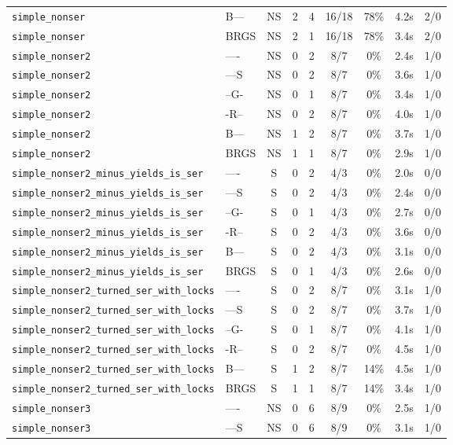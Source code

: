\begin{tabular}{llccccccc}
\texttt{simple_nonser} & B--- & NS & 2 & 4 & 16/18 & 78\% & 4.2s & 2/0 \\
\texttt{simple_nonser} & BRGS & NS & 2 & 1 & 16/18 & 78\% & 3.4s & 2/0 \\
\texttt{simple_nonser2} & ---- & NS & 0 & 2 & 8/7 & 0\% & 2.4s & 1/0 \\
\texttt{simple_nonser2} & ---S & NS & 0 & 2 & 8/7 & 0\% & 3.6s & 1/0 \\
\texttt{simple_nonser2} & --G- & NS & 0 & 1 & 8/7 & 0\% & 3.4s & 1/0 \\
\texttt{simple_nonser2} & -R-- & NS & 0 & 2 & 8/7 & 0\% & 4.0s & 1/0 \\
\texttt{simple_nonser2} & B--- & NS & 1 & 2 & 8/7 & 0\% & 3.7s & 1/0 \\
\texttt{simple_nonser2} & BRGS & NS & 1 & 1 & 8/7 & 0\% & 2.9s & 1/0 \\
\texttt{simple_nonser2_minus_yields_is_ser} & ---- & S & 0 & 2 & 4/3 & 0\% & 2.0s & 0/0 \\
\texttt{simple_nonser2_minus_yields_is_ser} & ---S & S & 0 & 2 & 4/3 & 0\% & 2.4s & 0/0 \\
\texttt{simple_nonser2_minus_yields_is_ser} & --G- & S & 0 & 1 & 4/3 & 0\% & 2.7s & 0/0 \\
\texttt{simple_nonser2_minus_yields_is_ser} & -R-- & S & 0 & 2 & 4/3 & 0\% & 3.6s & 0/0 \\
\texttt{simple_nonser2_minus_yields_is_ser} & B--- & S & 0 & 2 & 4/3 & 0\% & 3.1s & 0/0 \\
\texttt{simple_nonser2_minus_yields_is_ser} & BRGS & S & 0 & 1 & 4/3 & 0\% & 2.6s & 0/0 \\
\texttt{simple_nonser2_turned_ser_with_locks} & ---- & S & 0 & 2 & 8/7 & 0\% & 3.1s & 1/0 \\
\texttt{simple_nonser2_turned_ser_with_locks} & ---S & S & 0 & 2 & 8/7 & 0\% & 3.7s & 1/0 \\
\texttt{simple_nonser2_turned_ser_with_locks} & --G- & S & 0 & 1 & 8/7 & 0\% & 4.1s & 1/0 \\
\texttt{simple_nonser2_turned_ser_with_locks} & -R-- & S & 0 & 2 & 8/7 & 0\% & 4.5s & 1/0 \\
\texttt{simple_nonser2_turned_ser_with_locks} & B--- & S & 1 & 2 & 8/7 & 14\% & 4.5s & 1/0 \\
\texttt{simple_nonser2_turned_ser_with_locks} & BRGS & S & 1 & 1 & 8/7 & 14\% & 3.4s & 1/0 \\
\texttt{simple_nonser3} & ---- & NS & 0 & 6 & 8/9 & 0\% & 2.5s & 1/0 \\
\texttt{simple_nonser3} & ---S & NS & 0 & 6 & 8/9 & 0\% & 3.1s & 1/0 \\

\end{tabular}
